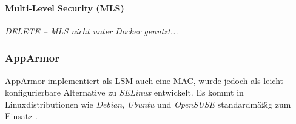 \documentclass[../main.tex]{subfiles}
\begin{document}

				\paragraph{Multi-Level Security (MLS)}
					\emph{DELETE -- MLS nicht unter Docker genutzt...}







      \subsubsection{AppArmor}
				AppArmor implementiert als LSM auch eine MAC, wurde jedoch als leicht konfigurierbare Alternative zu \emph{SELinux} entwickelt. Es kommt in Linuxdistributionen wie \emph{Debian}, \emph{Ubuntu} und \emph{OpenSUSE} standardmäßig zum Einsatz \cite{apparmorUbuntu}.
\end{document}
